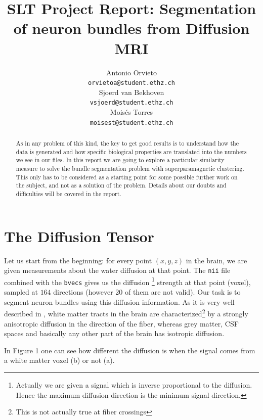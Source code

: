 \documentclass{article} %
\title{SLT Project Report: Segmentation of neuron bundles from Diffusion MRI}
\author{
Antonio Orvieto \\
\texttt{orvietoa@student.ethz.ch} \\
\And
Sjoerd van Bekhoven \\
\texttt{vsjoerd@student.ethz.ch} \\
\And
Moisés Torres \\
\texttt{moisest@student.ethz.ch} \\
}
\begin{document}
\maketitle

\begin{abstract}
As in any problem of this kind, the key to get good results is to understand how the data is generated and how specific biological properties are translated into the numbers we see in our files. In this report we are going to explore a particular similarity measure to solve the bundle segmentation problem with superparamagnetic clustering. This only has to be considered as a starting point for some possible further work on the subject, and not as a solution of the problem. Details about our doubts and difficulties will be covered in the report.
\end{abstract}

\section{The Diffusion Tensor}
Let us start from the beginning: for  every point $(x,y,z)$ in the brain, we are given measurements about the water diffusion at that point. The \texttt{nii} file combined with the \texttt{bvecs} gives us the diffusion
\footnote{Actually we are given a signal which is inverse proportional to the diffusion. Hence the maximum diffusion direction is the minimum signal direction.} 
strength at that point (voxel), sampled at $164$ directions (however 20 of them are not valid). Our task is to segment neuron bundles using this diffusion information.
As it is very well described in \cite{Mukherjee01042008}, white matter tracts in the brain are characterized\footnote{This is not actually true at fiber crossings} by a strongly anisotropic diffusion in the direction of the fiber, whereas grey matter, CSF spaces and basically any other part of the brain has isotropic diffusion. 

In Figure 1 one can see how different the diffusion is when the signal comes from a white matter voxel (b) or not (a).
\end{document}

